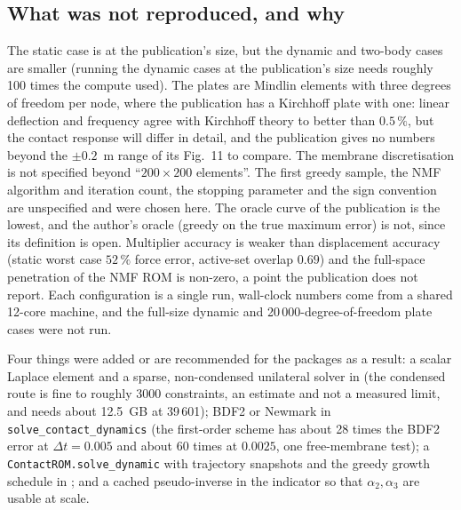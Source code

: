 \subsection*{What was not reproduced, and why}

The static case is at the publication's size, but the dynamic and two-body cases are smaller (running the dynamic cases at the publication's size needs roughly 100 times the compute used). The plates are Mindlin elements with three degrees of freedom per node, where the publication has a Kirchhoff plate with one: linear deflection and frequency agree with Kirchhoff theory to better than $0.5\,\%$, but the contact response will differ in detail, and the publication gives no numbers beyond the $\pm0.2$~m range of its Fig.~11 to compare. The membrane discretisation is not specified beyond ``$200\times200$ elements''. The first greedy sample, the NMF algorithm and iteration count, the stopping parameter and the sign convention are unspecified and were chosen here. The oracle curve of the publication is the lowest, and the author's oracle (greedy on the true maximum error) is not, since its definition is open. Multiplier accuracy is weaker than displacement accuracy (static worst case $52\,\%$ force error, active-set overlap $0.69$) and the full-space penetration of the NMF ROM is non-zero, a point the publication does not report. Each configuration is a single run, wall-clock numbers come from a shared 12-core machine, and the full-size dynamic and 20\,000-degree-of-freedom plate cases were not run.

Four things were added or are recommended for the packages as a result: a scalar Laplace element and a sparse, non-condensed unilateral solver in \fea{} (the condensed route is fine to roughly 3000 constraints, an estimate and not a measured limit, and needs about 12.5~GB at 39\,601); BDF2 or Newmark in \texttt{solve\_contact\_dynamics} (the first-order scheme has about 28 times the BDF2 error at $\Delta t=0.005$ and about 60 times at $0.0025$, one free-membrane test); a \texttt{ContactROM.solve\_dynamic} with trajectory snapshots and the greedy growth schedule in \rom{}; and a cached pseudo-inverse in the indicator so that $\alpha_2,\alpha_3$ are usable at scale.
